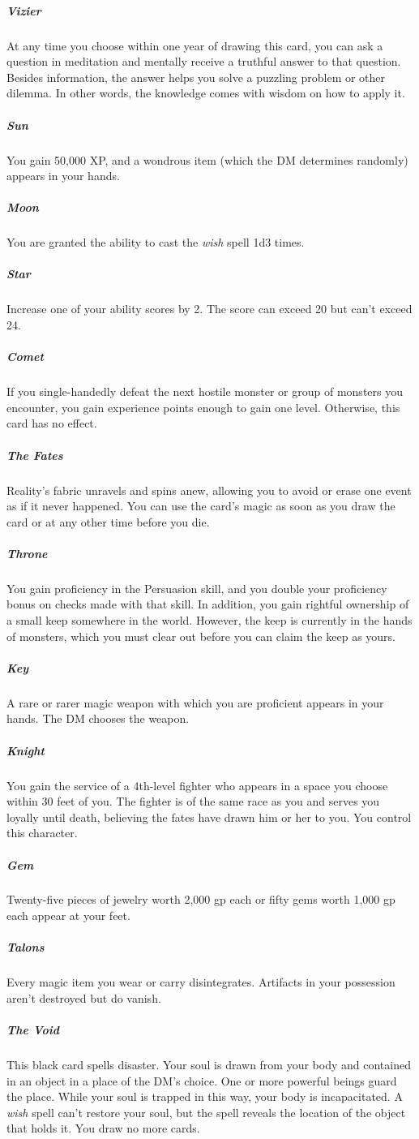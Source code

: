 \documentclass[10pt,a4paper,twoside,bg=print,twocolumn,openany,nodeprecatedcode]{dndbook}
\begin{document}
\subparagraph{Vizier}
At any time you choose within one year of drawing this card, you can ask a question in meditation and mentally receive a truthful answer to that question. Besides information, the answer helps you solve a puzzling problem or other dilemma. In other words, the knowledge comes with wisdom on how to apply it.

\subparagraph{Sun}
You gain 50,000 XP, and a wondrous item (which the DM determines randomly) appears in your hands.

\subparagraph{Moon}
You are granted the ability to cast the \textit{wish} spell 1d3 times.

\subparagraph{Star}
Increase one of your ability scores by 2. The score can exceed 20 but can't exceed 24.

\subparagraph{Comet}
If you single-handedly defeat the next hostile monster or group of monsters you encounter, you gain experience points enough to gain one level. Otherwise, this card has no effect.

\subparagraph{The Fates}
Reality's fabric unravels and spins anew, allowing you to avoid or erase one event as if it never happened. You can use the card's magic as soon as you draw the card or at any other time before you die.

\subparagraph{Throne}
You gain proficiency in the Persuasion skill, and you double your proficiency bonus on checks made with that skill. In addition, you gain rightful ownership of a small keep somewhere in the world. However, the keep is currently in the hands of monsters, which you must clear out before you can claim the keep as yours.

\subparagraph{Key}
A rare or rarer magic weapon with which you are proficient appears in your hands. The DM chooses the weapon.

\subparagraph{Knight}
You gain the service of a 4th-level fighter who appears in a space you choose within 30 feet of you. The fighter is of the same race as you and serves you loyally until death, believing the fates have drawn him or her to you. You control this character.

\subparagraph{Gem}
Twenty-five pieces of jewelry worth 2,000 gp each or fifty gems worth 1,000 gp each appear at your feet.

\subparagraph{Talons}
Every magic item you wear or carry disintegrates. Artifacts in your possession aren't destroyed but do vanish.

\subparagraph{The Void}
This black card spells disaster. Your soul is drawn from your body and contained in an object in a place of the DM's choice. One or more powerful beings guard the place. While your soul is trapped in this way, your body is incapacitated. A \textit{wish} spell can't restore your soul, but the spell reveals the location of the object that holds it. You draw no more cards.
\end{document}
